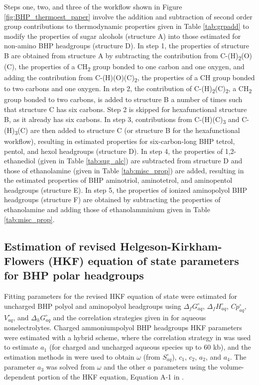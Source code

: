 Steps one, two, and three of the workflow shown in Figure \ref{fig:BHP_thermoest_paper} involve the addition and subtraction of second order group contributions to thermodynamic properties given in Table \ref{tab:grpadd} to modify the properties of sugar alcohols (structure A) into those estimated for non-amino BHP headgroups (structure D). In step 1, the properties of structure B are obtained from structure A by subtracting the contribution from C-(H)\textsubscript{2}(O)(C), the properties of a CH\textsubscript{2} group bonded to one carbon and one oxygen, and adding the contribution from C-(H)(O)(C)\textsubscript{2}, the properties of a CH group bonded to two carbons and one oxygen. In step 2, the contribution of C-(H)\textsubscript{2}(C)\textsubscript{2}, a CH\textsubscript{2} group bonded to two carbons, is added to structure B a number of times such that structure C has six carbons. Step 2 is skipped for hexafunctional structure B, as it already has six carbons. In step 3, contributions from C-(H)(C)\textsubscript{3} and C-(H)\textsubscript{3}(C) are then added to structure C (or structure B for the hexafunctional workflow), resulting in estimated properties for six-carbon-long BHP tetrol, pentol, and hexol headgroups (structure D). In step 4, the properties of 1,2-ethanediol (given in Table \ref{tab:sug_alc}) are subtracted from structure D and those of ethanolamine (given in Table \ref{tab:misc_prop}) are added, resulting in the estimated properties of BHP aminotriol, aminotetrol, and aminopentol headgroups (structure E). In step 5, the properties of ionized aminopolyol BHP headgroups (structure F) are obtained by subtracting the properties of ethanolamine and adding those of ethanolamminium given in Table \ref{tab:misc_prop}.


\subsection{Estimation of revised Helgeson-Kirkham-Flowers (HKF) equation of state parameters for BHP polar headgroups}

Fitting parameters for the revised HKF equation of state were estimated for uncharged BHP polyol and aminopolyol headgroups using $\Delta_{f}G^{\circ}_{aq}$, $\Delta_{f}H^{\circ}_{aq}$, $Cp^{\circ}_{aq}$, $V^{\circ}_{aq}$, and $\Delta_{h}G^{\circ}_{aq}$ and the correlation strategies given in \cite{plyasunov2001correlation} for aqueous nonelectrolytes. Charged ammoniumpolyol BHP headgroups HKF parameters were estimated with a hybrid scheme, where the correlation strategy in \cite{sverjensky2014water} was used to estimate $a_{1}$ (for charged and uncharged aqueous species up to 60 kb), and the estimation methods in \cite{shock1990calculation} were used to obtain $\omega$ (from $S^{\circ}_{aq}$), $c_{1}$, $c_{2}$, $a_{2}$, and $a_{4}$. The parameter $a_{3}$ was solved from $\omega$ and the other $a$ parameters using the volume-dependent portion of the HKF equation, Equation A-1 in \cite{tanger1988calculation}.


